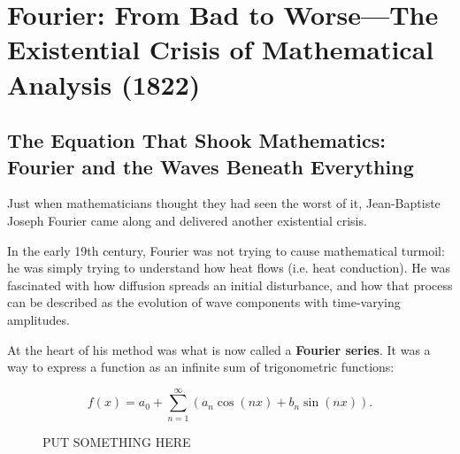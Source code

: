 \section{Fourier: From Bad to Worse—The Existential Crisis of Mathematical Analysis (1822)}

\subsection{The Equation That Shook Mathematics: Fourier and the Waves Beneath Everything}

Just when mathematicians thought they had seen the worst of it, Jean-Baptiste Joseph Fourier came along and delivered another existential crisis.

In the early 19th century, Fourier was not trying to cause mathematical turmoil: he was simply trying to understand how heat flows (i.e. heat conduction). He was fascinated with how diffusion spreads an initial disturbance, and how that process can be described as the evolution of wave components with time-varying amplitudes.

At the heart of his method was what is now called a \textbf{Fourier series}. It was a way to express a function as an infinite sum of trigonometric functions:

\[
f(x) = a_0 + \sum_{n=1}^{\infty} \left( a_n \cos(n x) + b_n \sin(n x) \right).
\]

\begin{figure}[H]

\begin{center}
\end{center}
  \caption{PUT SOMETHING HERE}
\end{figure}


